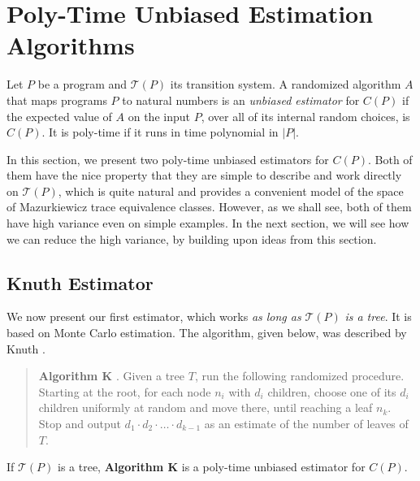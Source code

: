 
\section{Poly-Time Unbiased Estimation Algorithms} 
\label{sec:pestor}
Let $P$ be a program and $\mathcal{T}(P)$ its transition system.
A randomized algorithm $A$ that maps programs $P$ to natural numbers 
is an \emph{unbiased estimator} for $C(P)$ if
the expected value of $A$ on the input $P$, over all of its internal random choices, is $C(P)$.
It is poly-time if it runs in time polynomial in $|P|$.

In this section, we present two poly-time unbiased estimators for $C(P)$.
Both of them have the nice property that they are simple to describe and work directly on $\mathcal{T}(P)$, which is quite natural and provides a convenient model of the space of Mazurkiewicz trace equivalence classes. However, as we shall see, both of them have high variance even on simple examples. 
In the next section, we will see how we can reduce the high variance, by building upon ideas from this section.



\subsection{Knuth Estimator}
We now present our first estimator, which works \textit{as long as} $\mathcal{T}(P)$ \textit{is a tree}. It is based on Monte Carlo estimation.
The algorithm, given below, was described by Knuth \cite{knuth75}.

\begin{verse}
\label{algo:K}
\textbf{Algorithm K} \cite{knuth75}. 
Given a tree $T$, run the following randomized procedure.
Starting at the root,
for each node $n_i$ with $d_i$ children, choose one of its $d_i$ children uniformly at random and move there, until reaching a leaf $n_k$.
Stop and output $d_1 \cdot d_2 \cdot \ldots \cdot d_{k-1}$ as an estimate of the number of leaves of $T$.
\end{verse}

\begin{proposition}{\cite{knuth75}}
If $\mathcal{T}(P)$ is a tree, \textbf{Algorithm K} is a poly-time unbiased estimator for $C(P)$.
\end{proposition}

